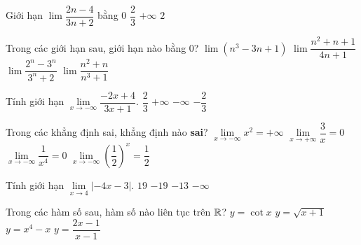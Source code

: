 \begin{ex}%
Giới hạn $ \lim\dfrac{2n-4}{3n+2} $ bằng
\choice
{$ 0 $}
{\True $ \dfrac{2}{3} $}
{$ +\infty $}
{$ 2 $}
\end{ex}

\begin{ex}%
Trong các giới hạn sau, giới hạn nào bằng $ 0 $?
\choice
{$ \lim(n^3-3n+1) $}
{$ \lim\dfrac{n^2+n+1}{4n+1} $}
{$ \lim\dfrac{2^n-3^n}{3^n+2} $}
{\True $ \lim\dfrac{n^2+n}{n^3+1} $}
\end{ex}

\begin{ex}%
Tính giới hạn $ \lim\limits_{x\to -\infty} \dfrac{-2x+4}{3x+1}. $
\choice
{$ \dfrac{2}{3} $}
{$ +\infty $}
{$ -\infty $}
{\True $ -\dfrac{2}{3} $}
\end{ex}

\begin{ex}%
Trong các khẳng định sai, khẳng định nào {\bf  sai}?
\choice
{$ \lim\limits_{x\to -\infty} x^2=+\infty$}
{$ \lim\limits_{x\to +\infty} \dfrac{3}{x}=0$}
{$ \lim\limits_{x\to -\infty} \dfrac{1}{x^4}=0$}
{\True $ \lim\limits_{x\to -\infty} \left(\dfrac{1}{2}\right)^x=\dfrac{1}{2}$}
\end{ex}

\begin{ex}%
Tính giới hạn $ \lim\limits_{x\to 4} |-4x-3|. $
\choice
{\True $ 19 $}
{$ -19 $}
{$ -13 $}
{$ -\infty $}
\end{ex}

\begin{ex}%
Trong các hàm số sau, hàm số nào liên tục trên $ \Bbb{R}$?
\choice
{$ y=\cot x $}
{$ y=\sqrt{x+1} $}
{\True $ y=x^4-x $}
{$ y=\dfrac{2x-1}{x-1} $}
\end{ex}


